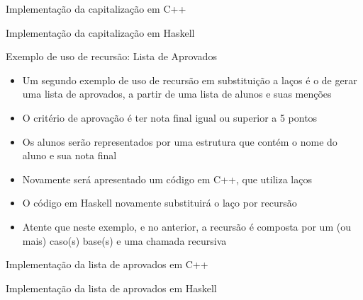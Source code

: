 \begin{frame}[fragile]{Implementação da capitalização em C++}
\end{frame}

\begin{frame}[fragile]{Implementação da capitalização em Haskell}
\end{frame}

\begin{frame}[fragile]{Exemplo de uso de recursão: Lista de Aprovados}

    \begin{itemize}
        \item Um segundo exemplo de uso de recursão em substituição a laços é o de gerar
            uma lista de aprovados, a partir de uma lista de alunos e suas menções

        \item O critério de aprovação é ter nota final igual ou superior a 5 pontos

        \item Os alunos serão representados por uma estrutura que contém o nome do aluno e
            sua nota final

        \item Novamente será apresentado um código em C++, que utiliza laços

        \item O código em Haskell novamente substituirá o laço por recursão

        \item Atente que neste exemplo, e no anterior, a recursão é composta por um (ou mais)
            caso(s) base(s) e uma chamada recursiva
    \end{itemize}

\end{frame}

\begin{frame}[fragile]{Implementação da lista de aprovados em C++}
\end{frame}

\begin{frame}[fragile]{Implementação da lista de aprovados em Haskell}
\end{frame}

